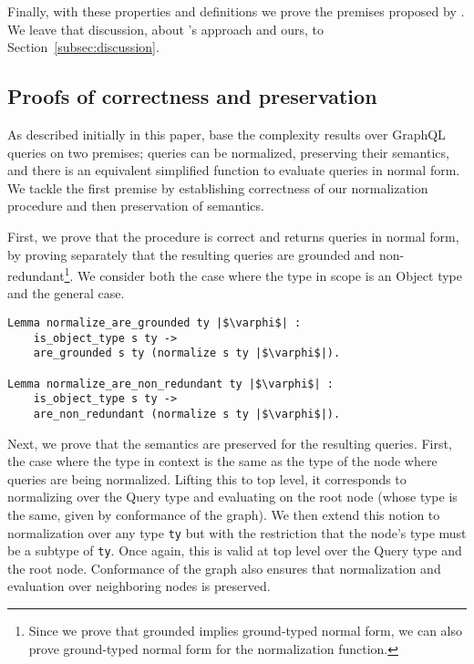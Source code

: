 Finally, with these properties and definitions we prove the premises proposed by \HP{}. We leave that discussion, about \HP{}'s approach and ours, to Section~\ref{subsec:discussion}.

\subsection{Proofs of correctness and preservation}

As described initially in this paper, \HP{} base the complexity results over GraphQL queries on two premises; queries can be normalized, preserving their semantics, and there is an equivalent simplified function to evaluate queries in normal form. We tackle the first premise by establishing correctness of our normalization procedure and then preservation of semantics.

First, we prove that the procedure is correct and returns queries in normal form, by proving separately that the resulting queries are grounded and non-redundant\footnote{Since we prove that grounded implies ground-typed normal form, we can also prove ground-typed normal form for the normalization function.}. We consider both the case where the type in scope is an Object type and the general case.

\begin{verbatim}
Lemma normalize_are_grounded ty |$\varphi$| :
    is_object_type s ty ->
    are_grounded s ty (normalize s ty |$\varphi$|).

Lemma normalize_are_non_redundant ty |$\varphi$| :
    is_object_type s ty ->
    are_non_redundant (normalize s ty |$\varphi$|).

\end{verbatim}

Next, we prove that the semantics are preserved for the resulting queries. First, the case where the type in context is the same as the type of the node where queries are being normalized. Lifting this to top level, it corresponds to normalizing over the Query type and evaluating on the root node (whose type is the same, given by conformance of the graph). We then extend this notion to normalization over any type \texttt{ty} but with the restriction that the node's type must be a subtype of \texttt{ty}. Once again, this is valid at top level over the Query type and the root node. Conformance of the graph also ensures that normalization and evaluation over neighboring nodes is preserved.

